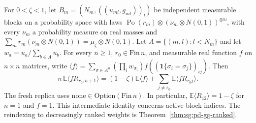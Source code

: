 \begin{theorem}\label{thm:sg:pd-gg-blocks}
  \leanok
For $0<\zeta<1$, let $B_m=(N_m,((u_{ml},g_{ml}))_l)$ be independent measurable blocks on a probability space with laws $\operatorname{Po}(r_m)\otimes(\nu_m\otimes N(0,1))^{\otimes\mathbb N}$, with every $\nu_m$ a probability measure on real masses and $\sum_mr_m(\nu_m\otimes N(0,1))=\mu_\zeta\otimes N(0,1)$. Let $A=\{(m,l):l<N_m\}$ and let $w_a=u_a/\sum_{b\in A}u_b$. For every $n\geq1$, $r_0\in\mathrm{Fin}\,n$, and measurable real function $f$ on $n\times n$ matrices, write $\langle f\rangle=\sum_{\sigma\in A^n}(\prod_iw_{\sigma_i})f((\mathbf1\{\sigma_i=\sigma_j\})_{ij})$. Then
\[
n\,\mathbb E\langle fR_{r_0,n+1}\rangle=(1-\zeta)\mathbb E\langle f\rangle+\sum_{j\ne r_0}\mathbb E\langle fR_{r_0j}\rangle.
\]
The fresh replica uses $\mathrm{none}\in\mathrm{Option}(\mathrm{Fin}\,n)$. In particular, $\mathbb E\langle R_{12}\rangle=1-\zeta$ for $n=1$ and $f=1$. This intermediate identity concerns active block indices. The reindexing to decreasingly ranked weights is Theorem~\ref{thm:sg:pd-gg-ranked}.
\end{theorem}
